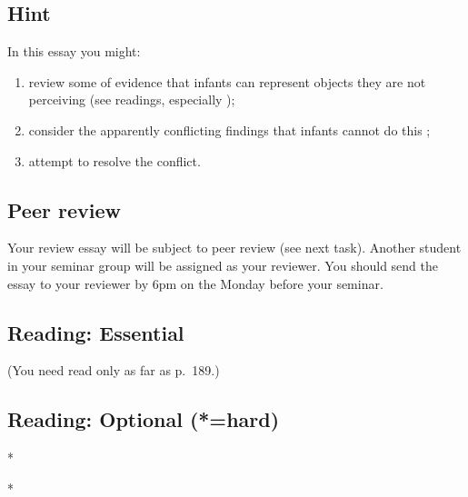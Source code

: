 \documentclass[12pt,\papersize]{extarticle}
\begin{document}
\subsection{Hint}
In this essay you might:
\begin{enumerate}
\item review some of evidence that infants can represent objects they are not perceiving (see readings, especially \citealp{baillargeon:1987_object});
\item consider the apparently conflicting findings that infants cannot do this \citep{Shinskey:2001fk};
\item attempt to resolve the conflict.
\end{enumerate}
%


\subsection{Peer review}
Your review essay will be subject to peer review (see next task). 
Another student in your seminar group will be assigned as your reviewer.
You should send the essay to your reviewer by 6pm on the Monday before your seminar.



\subsection{Reading: Essential}




  (You need read only as far as p.\ 189.)



\subsection{Reading: Optional (*=hard)}


*


*
\end{document}
